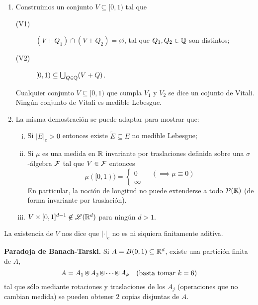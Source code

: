 
\begin{enumerate}
	\item Construimos un conjunto $V \subseteq [0,1)$ tal que
	\begin{description}
		\item[(V1)] $(V + Q_{1}) \cap (V + Q_{2}) = \varnothing$, tal que $Q_{1}, Q_{2} \in \mathbb{Q}$ son distintos;

		\item[(V2)] $[0,1) \subseteq \bigcup_{Q \in \mathbb{Q}} (V + Q)$.
	\end{description}
	Cualquier conjunto $V \subseteq [0,1)$ que cumpla $V_{1}$ y $V_{2}$ se dice un cojunto de Vitali. Ningún conjunto de Vitali es medible Lebesgue.

	\item La misma demostración se puede adaptar para mostrar que:
	\begin{enumerate}[i.]
		\item Si $|E|_{e} > 0$ entonces existe $\widetilde{E} \subseteq E$ no medible Lebesgue;

		\item Si $\mu$ es una medida en $\mathbb{R}$ invariante por traslaciones definida sobre una $\sigma$-álgebra $\mathcal{F}$ tal que $V \in \mathcal{F}$ entonces
		\[ \mu([0,1)) = \begin{cases}
			0 \qquad (\implies \mu \equiv 0) \\
			\infty
		\end{cases} \]
		En particular, la noción de longitud no puede extenderse a todo $\mathcal{P}(\mathbb{R})$ (de forma invariante por traslación).

		\item $V \times [0,1]^{d-1} \not\in \mathscr{L}(\mathbb{R}^d)$ para ningún $d > 1$.
	\end{enumerate}
\end{enumerate}

\begin{remark}
	La existencia de $V$ nos dice que $| \cdot |_e$ no es ni siquiera finitamente aditiva.
\end{remark}

\noindent \textbf{Paradoja de Banach-Tarski.} Si $A = B(0,1) \subseteq \mathbb{R}^d$, existe una partición finita de $A$,
\[ A = A_{1} \cupd A_{2} \cupd \cdots \cupd A_{k} \quad (\text{basta tomar } k = 6) \]
tal que sólo mediante rotaciones y traslaciones de los $A_{j}$ (operaciones que no cambian medida) se pueden obtener $2$ copias disjuntas de $A$.

